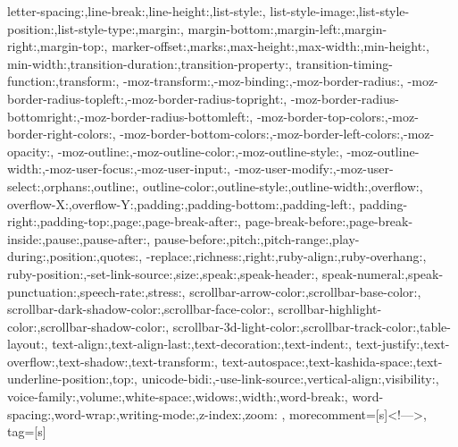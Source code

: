 {{            letter-spacing:,line-break:,line-height:,list-style:,
            list-style-image:,list-style-position:,list-style-type:,margin:,
            margin-bottom:,margin-left:,margin-right:,margin-top:,
            marker-offset:,marks:,max-height:,max-width:,min-height:,
            min-width:,transition-duration:,transition-property:,
            transition-timing-function:,transform:,
            -moz-transform:,-moz-binding:,-moz-border-radius:,
            -moz-border-radius-topleft:,-moz-border-radius-topright:,
            -moz-border-radius-bottomright:,-moz-border-radius-bottomleft:,
            -moz-border-top-colors:,-moz-border-right-colors:,
            -moz-border-bottom-colors:,-moz-border-left-colors:,-moz-opacity:,
            -moz-outline:,-moz-outline-color:,-moz-outline-style:,
            -moz-outline-width:,-moz-user-focus:,-moz-user-input:,
            -moz-user-modify:,-moz-user-select:,orphans:,outline:,
            outline-color:,outline-style:,outline-width:,overflow:,
            overflow-X:,overflow-Y:,padding:,padding-bottom:,padding-left:,
            padding-right:,padding-top:,page:,page-break-after:,
            page-break-before:,page-break-inside:,pause:,pause-after:,
            pause-before:,pitch:,pitch-range:,play-during:,position:,quotes:,
            -replace:,richness:,right:,ruby-align:,ruby-overhang:,
            ruby-position:,-set-link-source:,size:,speak:,speak-header:,
            speak-numeral:,speak-punctuation:,speech-rate:,stress:,
            scrollbar-arrow-color:,scrollbar-base-color:,
            scrollbar-dark-shadow-color:,scrollbar-face-color:,
            scrollbar-highlight-color:,scrollbar-shadow-color:,
            scrollbar-3d-light-color:,scrollbar-track-color:,table-layout:,
            text-align:,text-align-last:,text-decoration:,text-indent:,
            text-justify:,text-overflow:,text-shadow:,text-transform:,
            text-autospace:,text-kashida-space:,text-underline-position:,top:,
            unicode-bidi:,-use-link-source:,vertical-align:,visibility:,
            voice-family:,volume:,white-space:,widows:,width:,word-break:,
            word-spacing:,word-wrap:,writing-mode:,z-index:,zoom:
            },  
  morecomment=[s]{<!--}{-->},
  tag=[s]
}


